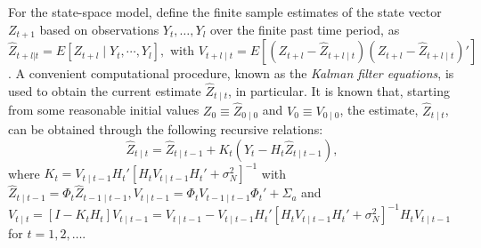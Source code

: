 For the state-space model, define the finite sample estimates of the state vector $Z_{t+1}$ based on observations $Y_t, \ldots, Y_l$ over the finite past time period, as $\hat{Z}_{t+l|t} = E[Z_{t+l} \;|\; Y_t,\cdots,Y_l],\text{ with } V_{t+l \;|\; t} = E[(Z_{t+l} - \hat{Z}_{t+l \;|\; t})(Z_{t+l} - \hat{Z}_{t+l \;|\; t})']$. A convenient computational procedure, known as the \emph{Kalman filter equations}, is used to obtain the current estimate $\hat{Z}_{t\;|\;t}$, in particular. It is known that, starting from some reasonable initial values $Z_0 \equiv \hat{Z}_{0 \;|\; 0}$ and $V_0 \equiv V_{0\;|\;0}$, the estimate, $\hat{Z}_{t \;|\; t}$, can be obtained through the following recursive relations:
	\begin{equation}\label{eqn:2hatz}
	\hat{Z}_{t \;|\; t} = \hat{Z}_{t \;|\; t-1} + K_t(Y_t - H_t \hat{Z}_{t \;|\; t-1}),
	\end{equation}
where $K_t= V_{t \;|\; t-1} H_t'[H_t V_{t \;|\; t-1} H_t' + \sigma_N^2]^{-1}$ with $\hat{Z}_{t \;|\; t-1} = \Phi_t \hat{Z}_{t-1\;|\; t-1},V_{t \;|\; t-1} = \Phi_t V_{t-1\;|\; t-1} \Phi_t' + \Sigma_{a}$ and $V_{t \;|\; t} = [I - K_t H_t] V_{t \;|\; t-1} = V_{t\;|\; t-1} - V_{t\;|\; t-1} H_t' [H_t V_{t \;|\; t-1} H_t' + \sigma_N^2]^{-1} H_t V_{t \;|\; t-1}$ for $t= 1,2, \ldots$.


